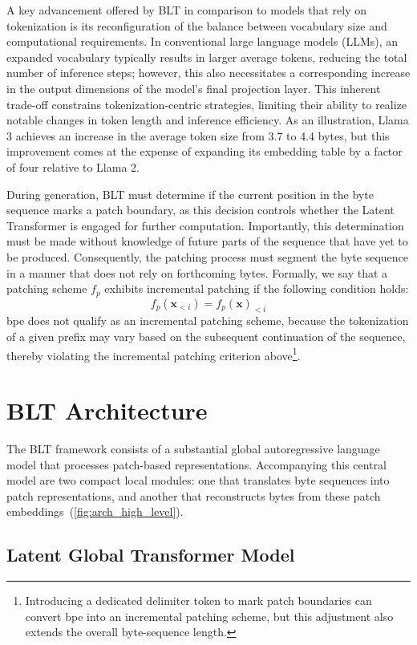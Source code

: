 A key advancement offered by {\textsc BLT} in comparison to models that rely on tokenization is its reconfiguration of the balance between vocabulary size and computational requirements. In conventional large language models (LLMs), an expanded vocabulary typically results in larger average tokens, reducing the total number of inference steps; however, this also necessitates a corresponding increase in the output dimensions of the model’s final projection layer. This inherent trade-off constrains tokenization-centric strategies, limiting their ability to realize notable changes in token length and inference efficiency. As an illustration, Llama 3 achieves an increase in the average token size from 3.7 to 4.4 bytes, but this improvement comes at the expense of expanding its embedding table by a factor of four relative to Llama 2.

During generation, {\textsc BLT} must determine if the current position in the byte sequence marks a patch boundary, as this decision controls whether the Latent Transformer is engaged for further computation. Importantly, this determination must be made without knowledge of future parts of the sequence that have yet to be produced. Consequently, the patching process must segment the byte sequence in a manner that does not rely on forthcoming bytes. Formally, we say that a patching scheme $f_p$ exhibits incremental patching if the following condition holds:
$$f_p(\pmb{x}_{<i}) = f_p(\pmb{x})_{<i}$$
bpe does not qualify as an incremental patching scheme, because the tokenization of a given prefix may vary based on the subsequent continuation of the sequence, thereby violating the incremental patching criterion above\footnote{Introducing a dedicated delimiter token to mark patch boundaries can convert bpe into an incremental patching scheme, but this adjustment also extends the overall byte-sequence length.}.

\section{{\textsc BLT} Architecture}
\label{section:architecture}
The {\textsc BLT} framework consists of a substantial global autoregressive language model that processes patch-based representations. Accompanying this central model are two compact local modules: one that translates byte sequences into patch representations, and another that reconstructs bytes from these patch embeddings~(\autoref{fig:arch_high_level}).

\subsection{Latent Global Transformer Model}

